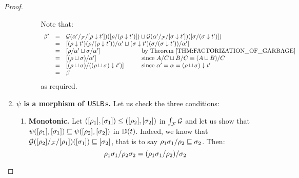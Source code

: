 \begin{proof}
\begin{enumerate}
\begin{enumerate}
\begin{enumerate}
      Note that:
      \[
        \begin{array}{rcll}
        \beta'
              & = & \ulbG(\ptF{\alpha'}{\cls{\redseq \sieve \tm'}})(\cls{\redseq / (\redseq \sieve \tm')}) \sqcup
                    \ulbG(\ptF{\alpha'}{\cls{\redseqtwo \sieve \tm'}})(\cls{\redseqtwo / (\redseqtwo \sieve \tm')}) \\
              & = &
                   \cls{
                     (\redseq \sieve \tm')(\redseq / (\redseq \sieve \tm'))/\alpha'
                     \sqcup
                     (\redseqtwo \sieve \tm')(\redseqtwo / (\redseqtwo \sieve \tm'))/\alpha'
                   } \\
              & = &
                   \cls{\redseq/\alpha' \sqcup \redseqtwo/\alpha'}
                   &\hspace{-5cm}\text{by \rthm{factorization_of_garbage}} \\
              & = &
                   \cls{(\redseq \sqcup \redseqtwo)/\alpha'}
                   &\hspace{-5cm}\text{since $A/C \sqcup B/C \permeq (A \sqcup B)/C$} \\
              & = &
                   \cls{(\redseq \sqcup \redseqtwo)/((\redseq \sqcup \redseqtwo) \sieve \tm')}
                   &\hspace{-5cm}\text{since $\alpha' = \alpha = (\redseq \sqcup \redseqtwo) \sieve \tm'$} \\
              & = & \beta \\
        \end{array}
      \]
      as required. 
    \end{enumerate}
  \end{enumerate}
\item {\bf $\psi$ is a morphism of $\mathsf{USLB}$s.}
  Let us check the three conditions:
  \begin{enumerate}
  \item {\bf Monotonic.}
    Let $({[\rho_1]},{[\sigma_1]}) \leq ({[\rho_2]},{[\sigma_2]})$ in $\int_{\mathcal{F}}{\mathcal{G}}$
    and let us show that
    $\psi({[\rho_1]},{[\sigma_1]}) \sqsubseteq \psi({[\rho_2]},{[\sigma_2]})$
    in $\mathbb{D}(t)$.
    Indeed, we know that $\mathcal{G}({[\rho_2]}/_{\mathcal{F}}/{[\rho_1]})({[\sigma_1]}) \sqsubseteq {[\sigma_2]}$,
    that is to say $\rho_1\sigma_1/\rho_2 \sqsubseteq \sigma_2$.
    Then:
    \[
      \rho_1\sigma_1/\rho_2\sigma_2
      = (\rho_1\sigma_1/\rho_2)/\sigma_2
\]
\end{enumerate}
\end{enumerate}
\end{proof}
